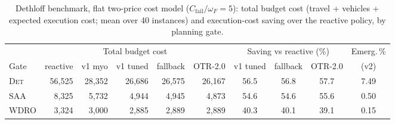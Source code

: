 \begin{table}[t]
\caption{Dethloff benchmark, flat two-price cost model
($C_{\mathrm{fail}}/\omega_F = 5$): total budget cost (travel +
vehicles + expected execution cost; mean over 40 instances) and
execution-cost saving over the reactive policy, by planning gate.}
\label{tab:dethloff}
\centering
\footnotesize
\setlength{\tabcolsep}{3pt}
\begin{tabular}{lrrrrrccc c}
\toprule
& \multicolumn{5}{c}{Total budget cost} &
\multicolumn{3}{c}{Saving vs reactive (\%)} & Emerg.\,\% \\
\cmidrule(lr){2-6}\cmidrule(lr){7-9}
Gate & reactive & v1 myo & v1 tuned & fallback & OTR-2.0 &
v1 tuned & fallback & OTR-2.0 & (v2) \\
\midrule
\textsc{Det} & 56,525 & 28,352 & 26,686 & 26,575 & 26,167 & 56.5 & 56.8 & 57.7 & 7.49 \\
\textsc{SAA} & 8,325 & 5,732 & 4,944 & 4,945 & 4,873 & 54.6 & 54.6 & 55.6 & 0.50 \\
\textsc{WDRO} & 3,324 & 3,000 & 2,885 & 2,889 & 2,889 & 40.3 & 40.1 & 39.1 & 0.15 \\
\bottomrule
\end{tabular}
\end{table}
